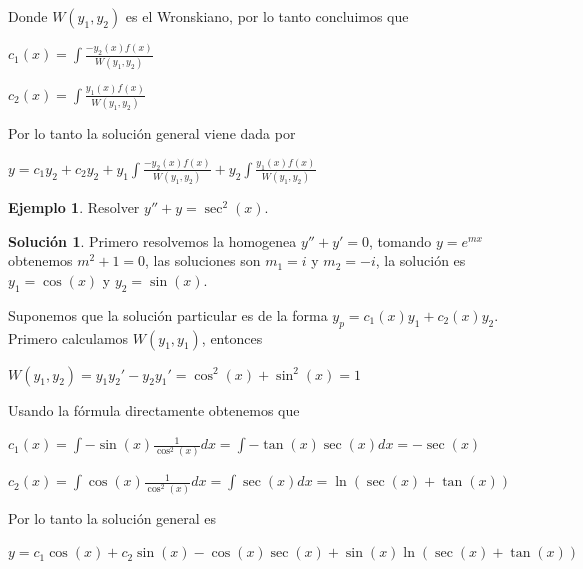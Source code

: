 \documentclass{article}
\theoremstyle{plain}
\theoremstyle{definition}
\newtheorem{ejem}[thm]{Ejemplo}
\newtheorem{sol}[thm]{Solución}
\begin{document}
Donde $W(y_1,y_2)$ es el Wronskiano, por lo tanto concluimos que


\begin{center}
$\displaystyle c_1(x) = \int \frac{-y_2(x)f(x)}{W(y_1,y_2)}$
\end{center}

\begin{center}
$\displaystyle c_2(x) = \int \frac{y_1(x)f(x)}{W(y_1,y_2)}$
\end{center}

Por lo tanto la solución general viene dada por


\begin{center}
$\displaystyle y= c_1y_2 +c_2y_2 + y_1\int \frac{-y_2(x)f(x)}{W(y_1,y_2)} +y_2 \int \frac{y_1(x)f(x)}{W(y_1,y_2)} $
\end{center}


\newpage


\begin{ejem}Resolver $y'' +y = \sec^2(x)$. \\
\end{ejem}

\begin{sol}Primero resolvemos la homogenea $y''+y'=0$, tomando $y=e^{mx}$ obtenemos $m^2+1=0$, las soluciones son $m_1=i$ y $m_2=-i$, la solución es  $y_1 = \cos(x)$ y $y_2 =\sin(x)$. \\
\end{sol}

Suponemos que la solución particular es de la forma $y_p= c_1(x)y_1 +c_2(x)y_2$. Primero calculamos $W(y_1,y_1)$, entonces

\begin{center}
$\displaystyle W(y_1,y_2) = y_1y_2'-y_2y_1' = \cos^2(x)+\sin^2(x) =1$
\end{center}


Usando la fórmula directamente obtenemos que


\begin{center}
$c_1(x) = \displaystyle \int -\sin(x) \frac{1}{\cos^2(x)} dx = \int -\tan(x)\sec(x)dx = -\sec(x)$
\end{center}


\begin{center}
$c_2(x) = \displaystyle \int \cos(x) \frac{1}{\cos^2(x)} dx = \int \sec(x)dx = \ln(\sec(x) +\tan(x))$
\end{center}

Por lo tanto la solución general es


\begin{center}
$y= \displaystyle c_1\cos(x) +c_2\sin(x) - \cos(x)\sec(x)+ \sin(x) \ln(\sec(x)+\tan(x)) $
\end{center}

\newpage
\end{document}
